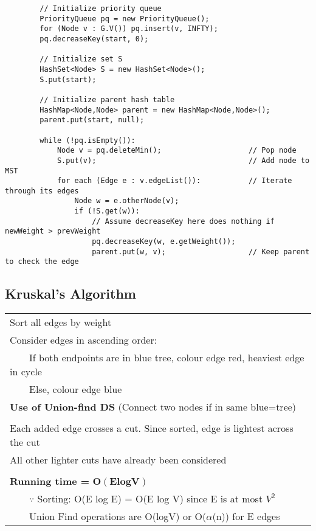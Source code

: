 \documentclass{article}
\newcommand{\tabitem}{~~\llap{\textbullet}~~}
\begin{document}
    \begin{verbatim}
        // Initialize priority queue
        PriorityQueue pq = new PriorityQueue();
        for (Node v : G.V()) pq.insert(v, INFTY);
        pq.decreaseKey(start, 0);

        // Initialize set S
        HashSet<Node> S = new HashSet<Node>();
        S.put(start);

        // Initialize parent hash table
        HashMap<Node,Node> parent = new HashMap<Node,Node>();
        parent.put(start, null);

        while (!pq.isEmpty()):
            Node v = pq.deleteMin();                    // Pop node
            S.put(v);                                   // Add node to MST
            for each (Edge e : v.edgeList()):           // Iterate through its edges
                Node w = e.otherNode(v);
                if (!S.get(w)):
                    // Assume decreaseKey here does nothing if newWeight > prevWeight
                    pq.decreaseKey(w, e.getWeight());   
                    parent.put(w, v);                   // Keep parent to check the edge
    \end{verbatim}

    \pagebreak

    \subsection{Kruskal's Algorithm}

    \begin{tabular}{l}
        Sort all edges by weight\\
        Consider edges in ascending order:\\
        \tabitem If both endpoints are in blue tree, colour edge red, heaviest edge in cycle\\
        \tabitem Else, colour edge blue\\
        \textbf{Use of Union-find DS} (Connect two nodes if in same blue=tree)\\\\
        Each added edge crosses a cut. Since sorted, edge is lightest across the cut\\
        All other lighter cuts have already been considered\\\\
        \textbf{Running time = } $\bm{O(E log V)}$\\
        \tabitem $\because$ Sorting: O(E log E) = O(E log V) since E is at most $V^{2}$\\
        \tabitem Union Find operations are O(logV) or O($\alpha$(n)) for E edges
    \end{tabular}
\end{document}
